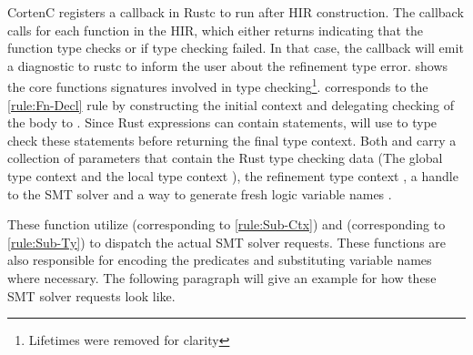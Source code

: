\documentclass[twoside, english, final]{sdqthesis}
\theoremstyle{definition}
\begin{document}
CortenC registers a callback in Rustc to run after HIR construction. The callback calls  for each function in the HIR, which either returns  indicating that the function type checks or  if type checking failed. In that case, the callback will emit a diagnostic to rustc to inform the user about the refinement type error.
 shows the core functions signatures involved in type checking\footnote{Lifetimes were removed for clarity}.  corresponds to the \cref{rule:Fn-Decl} rule by constructing the initial context and delegating checking of the body to . 
Since Rust expressions can contain statements,  will use  to type check these statements before returning the final type context.
Both  and  carry a collection of parameters that contain the Rust type checking data (The global type context  and the local type context ), the refinement type context , a handle to the SMT solver  and a way to generate fresh logic variable names .

These function utilize  (corresponding to \cref{rule:Sub-Ctx}) and  (corresponding to \cref{rule:Sub-Ty}) to dispatch the actual SMT solver requests. These functions are also responsible for encoding the predicates and substituting variable names where necessary. 
The following paragraph will give an example for how these SMT solver requests look like.
\end{document}
